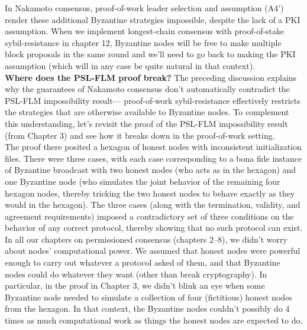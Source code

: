 In Nakamoto consensus, proof-of-work leader selection and assumption (A4’) render these
additional Byzantine strategies impossible, despite the lack of a PKI assumption. When
we implement longest-chain consensus with proof-of-stake sybil-resistance in chapter 12,
Byzantine nodes will be free to make multiple block proposals in the same round and we’ll
need to go back to making the PKI assumption (which will in any case be quite natural in
that context).\\

\noindent
\textbf{Where does the PSL-FLM proof break?} The preceding discussion explains why the
guarantees of Nakamoto consensus don’t automatically contradict the PSL-FLM impossibility result— proof-of-work sybil-resistance effectively restricts the strategies that are otherwise available to Byzantine nodes. To complement this understanding, let’s revisit the proof
of the PSL-FLM impossibility result (from Chapter 3) and see how it breaks down in the
proof-of-work setting.\\

The proof there posited a hexagon of honest nodes with inconsistent initialization files.
There were three cases, with each case corresponding to a bona fide instance of Byzantine
broadcast with two honest nodes (who acts as in the hexagon) and one Byzantine node (who
simulates the joint behavior of the remaining four hexagon nodes, thereby tricking the two
honest nodes to behave exactly as they would in the hexagon). The three cases (along with
the termination, validity, and agreement requirements) imposed a contradictory set of three
conditions on the behavior of any correct protocol, thereby showing that no such protocol
can exist.\\

In all our chapters on permissioned consensus (chapters 2–8), we didn't worry about
nodes’ computational power. We assumed that honest nodes were powerful enough to carry
out whatever a protocol asked of them, and that Byzantine nodes could do whatever they
want (other than break cryptography). In particular, in the proof in Chapter 3, we didn’t
blink an eye when some Byzantine node needed to simulate a collection of four (fictitious)
honest nodes from the hexagon. In that context, the
Byzantine nodes couldn’t possibly do 4 times as much computational work as things the honest
nodes are expected to do.\\

